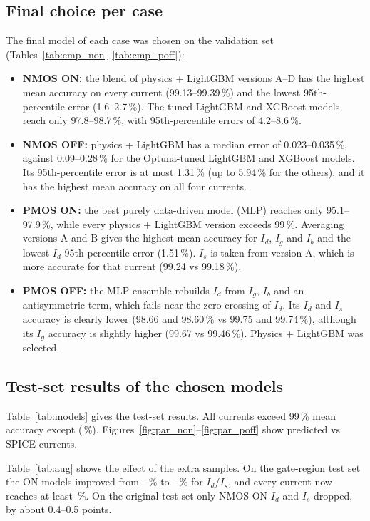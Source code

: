 \documentclass[12pt]{article}
\begin{document}
\subsection{Final choice per case}
The final model of each case was chosen on the validation set
(Tables~\ref{tab:cmp_non}--\ref{tab:cmp_poff}):
\begin{itemize}
    \item \textbf{NMOS ON:} the blend of physics + LightGBM versions A--D has the highest mean
          accuracy on every current (99.13--99.39\,\%) and the lowest 95th-percentile error
          (1.6--2.7\,\%). The tuned LightGBM and XGBoost models reach only 97.8--98.7\,\%, with
          95th-percentile errors of 4.2--8.6\,\%.
    \item \textbf{NMOS OFF:} physics + LightGBM has a median error of 0.023--0.035\,\%, against
          0.09--0.28\,\% for the Optuna-tuned LightGBM and XGBoost models. Its 95th-percentile error
          is at most 1.31\,\% (up to 5.94\,\% for the others), and it has the highest mean accuracy
          on all four currents.
    \item \textbf{PMOS ON:} the best purely data-driven model (MLP) reaches only 95.1--97.9\,\%,
          while every physics + LightGBM version exceeds 99\,\%. Averaging versions A and B gives
          the highest mean accuracy for $I_d$, $I_g$ and $I_b$ and the lowest $I_d$
          95th-percentile error (1.51\,\%). $I_s$ is taken from version A, which is more accurate
          for that current (99.24 vs 99.18\,\%).
    \item \textbf{PMOS OFF:} the MLP ensemble rebuilds $I_d$ from $I_g$, $I_b$ and an
          antisymmetric term, which fails near the zero crossing of $I_d$. Its $I_d$ and $I_s$
          accuracy is clearly lower (98.66 and 98.60\,\% vs 99.75 and 99.74\,\%), although its $I_g$
          accuracy is slightly higher (99.67 vs 99.46\,\%). Physics + LightGBM was selected.
\end{itemize}

\subsection{Test-set results of the chosen models}
Table~\ref{tab:models} gives the test-set results. All currents exceed 99\,\% mean accuracy except
\ModelMinAccWhere{} (\ModelMinAcc\,\%). Figures~\ref{fig:par_non}--\ref{fig:par_poff} show
predicted vs SPICE currents.

Table~\ref{tab:aug} shows the effect of the extra samples. On the gate-region test set the ON
models improved from \AugOnBeforeMin--\AugOnBeforeMax\,\% to \AugOnAfterMin--\AugOnAfterMax\,\%
for $I_d$/$I_s$, and every current now reaches at least \AugAfterMin\,\%. On the original test set
only NMOS ON $I_d$ and $I_s$ dropped, by about 0.4--0.5 points.
\end{document}

